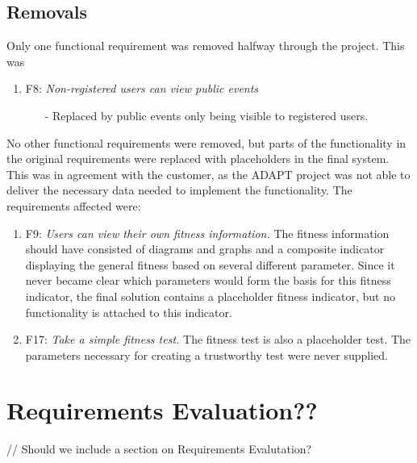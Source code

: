\subsection{Removals}
Only one functional requirement was removed halfway through the project. This was 
\begin{enumerate}
    \item F8: \textit{Non-registered users can view public events}
    \begin{itemize}
        \item[-] Replaced by public events only being visible to registered users.
    \end{itemize}
\end{enumerate}
 
No other functional requirements were removed, but parts of the functionality in the original requirements were replaced with placeholders in the final system. This was in agreement with the customer, as the ADAPT project was not able to deliver the necessary data needed to implement the functionality. The requirements affected were: 
\begin{enumerate}
    \item  F9: \textit{Users can view their own fitness information.} The fitness information should have consisted of diagrams and graphs and a composite indicator displaying the general fitness based on several different parameter. Since it never became clear which parameters would form the basis for this fitness indicator, the final solution contains a placeholder fitness indicator, but no functionality is attached to this indicator. 
    \item F17: \textit{Take a simple fitness test.} The fitness test is also a placeholder test. The parameters necessary for creating a trustworthy test were never supplied.
    
\end{enumerate}


\section{Requirements Evaluation??}

// Should we include a section on Requirements Evalutation?

